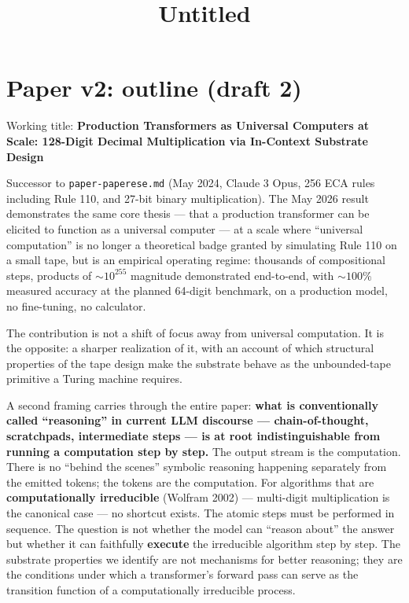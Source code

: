 \documentclass[twocolumn,switch,10pt]{article}
\title{Untitled}
\begin{document}
\twocolumn[\begin{@twocolumnfalse}
\maketitle

\vspace{0.4cm}

\vspace{0.5cm}
\end{@twocolumnfalse}]

\section{Paper v2: outline (draft 2)}\label{paper-v2-outline-draft-2}

Working title: \textbf{Production Transformers as Universal Computers at Scale: 128-Digit Decimal Multiplication via In-Context Substrate Design}

Successor to \texttt{paper-paperese.md} (May 2024, Claude 3 Opus, 256 ECA rules
including Rule 110, and 27-bit binary multiplication). The May 2026
result demonstrates the same core thesis --- that a production transformer
can be elicited to function as a universal computer --- at a scale where
``universal computation'' is no longer a theoretical badge granted by
simulating Rule 110 on a small tape, but is an empirical operating
regime: thousands of compositional steps, products of \(\sim 10^{255}\)
magnitude demonstrated end-to-end, with \(\sim 100\%\) measured accuracy
at the planned 64-digit benchmark, on a production model, no
fine-tuning, no calculator.

The contribution is not a shift of focus away from universal computation.
It is the opposite: a sharper realization of it, with an account of
which structural properties of the tape design make the substrate
behave as the unbounded-tape primitive a Turing machine requires.

A second framing carries through the entire paper: \textbf{what is conventionally
called ``reasoning'' in current LLM discourse --- chain-of-thought, scratchpads,
intermediate steps --- is at root indistinguishable from running a
computation step by step.} The output stream is the computation. There is
no ``behind the scenes'' symbolic reasoning happening separately from the
emitted tokens; the tokens are the computation. For algorithms that are
\textbf{computationally irreducible} (Wolfram 2002) --- multi-digit
multiplication is the canonical case --- no shortcut exists. The atomic
steps must be performed in sequence. The question is not whether the
model can ``reason about'' the answer but whether it can faithfully
\textbf{execute} the irreducible algorithm step by step. The substrate
properties we identify are not mechanisms for better reasoning; they
are the conditions under which a transformer's forward pass can serve
as the transition function of a computationally irreducible process.
\end{document}
